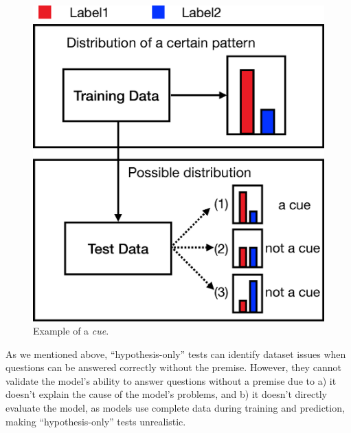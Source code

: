 
\begin{figure}[th]
\centering
\includegraphics[width=0.45\columnwidth]{picture/cue_def.eps}
\caption{Example of a {\em cue}. }
\label{fig:cue_def}
\end{figure}

As we mentioned above, ``hypothesis-only'' tests can identify dataset issues 
when questions can be answered correctly without the premise.
However, they cannot validate the model's ability to answer questions without a 
premise due to 
a) it doesn't explain the cause of the model's problems, 
and b) it doesn't directly evaluate the model, 
as models use complete data during training and prediction, 
making ``hypothesis-only'' tests unrealistic.

